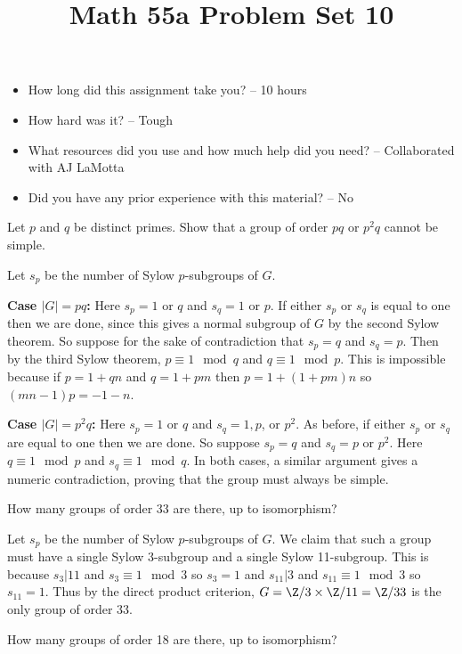 \documentclass[11pt,letterpaper]{article}
\title{\textbf{Math 55a Problem Set 10}}
\begin{document}
\maketitle
\setcounter{page}{0}
\thispagestyle{empty}

\begin{itemize}
  \item How long did this assignment take you? -- 10 hours
  \item How hard was it? -- Tough
  \item What resources did you use and how much help did you need? -- Collaborated with AJ LaMotta
  \item Did you have any prior experience with this material? -- No
\end{itemize}

\pagebreak
\begin{problem}
Let $p$ and $q$ be distinct primes. Show that a group of order $pq$ or $p^2q$ cannot be simple.
\end{problem}
Let $s_p$ be the number of Sylow $p$-subgroups of $G$.

\textbf{Case $|G|=pq$:} Here $s_p=1$ or $q$ and $s_q=1$ or $p$. If either $s_p$ or $s_q$ is equal to one then we are done, since this gives a normal subgroup of $G$ by the second Sylow theorem. So suppose for the sake of contradiction that $s_p=q$ and $s_q=p$. Then by the third Sylow theorem, $p\equiv 1\mod q$ and $q\equiv 1\mod p$. This is impossible because if $p=1+qn$ and $q=1+pm$ then $p=1+(1+pm)n$ so $(mn-1)p=-1-n$. 

\textbf{Case $|G|=p^2q$:} Here $s_p=1$ or $q$ and $s_q=1, p$, or $p^2$. As before, if either $s_p$ or $s_q$ are equal to one then we are done. So suppose $s_p=q$ and $s_q=p$ or $p^2$. Here $q\equiv 1\mod p$ and $s_q\equiv 1\mod q$. In both cases, a similar argument gives a numeric contradiction, proving that the group must always be simple.

\pagebreak
\begin{problem}
How many groups of order 33 are there, up to isomorphism?
\end{problem}
Let $s_p$ be the number of Sylow $p$-subgroups of $G$. We claim that such a group must have a single Sylow 3-subgroup and a single Sylow 11-subgroup. This is because $s_3|11$ and $s_3\equiv 1\mod 3$ so $s_3=1$ and $s_{11}|3$ and $s_{11}\equiv 1\mod 3$ so $s_{11}=1$. Thus by the direct product criterion, $G=\Z/3\times \Z/11=\Z/33$ is the only group of order $33$.

\pagebreak
\begin{problem}
How many groups of order 18 are there, up to isomorphism?
\end{problem}
\end{document}
